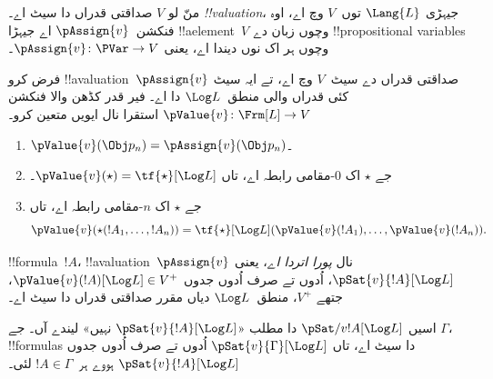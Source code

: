 \documentclass[../../../include/open-logic-section]{subfiles}
\begin{document}


\begin{defn}[!!^{valuation}s]
منّ لو $V$ صداقتی قدراں دا سیٹ اے۔ \emph{!!{valuation}}،
جیہڑی $\Lang{L}$ توں~$V$ وچ اے، اوہ فنکشن~$\pAssign{v}$ اے
جیہڑا !!a{element}~$V$ وچوں زبان دے !!{propositional variable}s
وچوں ہر اک نوں دیندا اے، یعنی $\pAssign{v} \colon
\PVar \to V$۔
\end{defn}

\begin{defn}
  فرض کرو !!a{valuation}~$\pAssign{v}$ صداقتی قدراں دے
  سیٹ~$V$ وچ اے، تے ایہ سیٹ کئی قدراں والی منطق~$\Log L$ دا اے۔
  فیر قدر کڈھن والا فنکشن $\pValue{v} \colon \Frm[L] \to V$
  استقرا نال ایویں متعین کرو۔
  \begin{enumerate}
    \item $\pValue{v}(\Obj p_n) = \pAssign{v}(\Obj p_n)$۔
    \item جے $\star$ اک $0$-مقامی رابطہ اے، تاں $\pValue{v}(\star)  = \tf{\star}[\Log L]$۔
    \item جے $\star$ اک $n$-مقامی رابطہ اے، تاں
    \[
      \pValue{v}(\star(!A_1, \dots, !A_n)) = \tf{\star}[\Log L]
      (\pValue{v}(!A_1), \dots, \pValue{v}(!A_n)).
    \]
  \end{enumerate}
\end{defn}

\begin{defn}
 !!{formula}~$!A$،
!!a{valuation}~$\pAssign{v}$ نال \emph{پورا اتردا اے}، یعنی
$\pSat{v}{!A}[\Log L]$، اُدوں تے صرف اُدوں جدوں
$\pValue{v}(!A)[\Log L] \in V^+$، جتھے $V^+$، منطق~$\Log L$
دیاں مقرر صداقتی قدراں دا سیٹ اے۔

  اسیں $\pSat/{v}{!A}[\Log L]$ دا مطلب «$\pSat{v}{!A}[\Log
  L]$ نہیں» لیندے آں۔ جے $\Gamma$، !!{formula}s دا سیٹ اے، تاں
  $\pSat{v}{\Gamma}[\Log
  L]$ اُدوں تے صرف اُدوں جدوں $\pSat{v}{!A}[\Log L]$ ہووے
  ہر~$!A \in \Gamma$ لئی۔
\end{defn}
\end{document}
